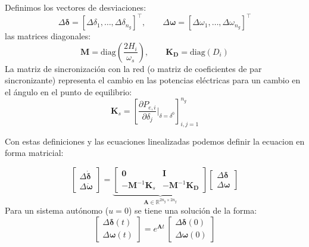Definimos los vectores de desviaciones: 
\begin{equation}
    \Delta\boldsymbol{\delta} = [\Delta\delta_1, \ldots, \Delta\delta_{n_g}]^\top, \qquad
    \Delta\boldsymbol{\omega} = [\Delta\omega_1, \ldots, \Delta\omega_{n_g}]^\top
\end{equation}
 las matrices diagonales:
 \begin{equation}
    \mathbf{M} = \mathrm{diag}\left(\frac{2H_i}{\omega_s}\right), \qquad
    \mathbf{K_D} = \mathrm{diag}(D_i)
 \end{equation}
 La matriz de sincronización con la red (o matriz de coeficientes de par sincronizante) representa el cambio en las potencias eléctricas para un cambio en el ángulo en el punto de equilibrio: 
\begin{equation}
    \mathbf{K}_s = \left[\frac{\partial P_{e,i}}{\partial \delta_j}\big|_{\delta = \delta^0}\right]_{i,j=1}^{n_g}
\end{equation}



Con estas definiciones y las ecuaciones linealizadas podemos definir la ecuacion en forma matricial: 

       \begin{equation}
    \begin{bmatrix} \Delta\dot{\boldsymbol{\delta}} \\ \Delta\dot{\boldsymbol{\omega}} \end{bmatrix}
    =
    \underbrace{
    \begin{bmatrix}
        \mathbf{0}  & \mathbf{I} \\
        -\mathbf{M}^{-1}\mathbf{K}_s & -\mathbf{M}^{-1}\mathbf{K_D}
    \end{bmatrix}
    }_{\mathbf{A} \in \mathbb{R}^{2n_g \times 2n_g}}
    \begin{bmatrix} \Delta\boldsymbol{\delta} \\ \Delta\boldsymbol{\omega} \end{bmatrix}
    \label{eq:linear_sys}
\end{equation}
Para un sistema autónomo ($u=0$) se tiene una solución de la forma: 
\begin{equation}
    \begin{bmatrix} \Delta\boldsymbol{\delta}(t) \\ \Delta\boldsymbol{\omega}(t) \end{bmatrix}
    = e^{\mathbf{A}t}\,
    \begin{bmatrix} \Delta\boldsymbol{\delta}(0) \\ \Delta\boldsymbol{\omega}(0) \end{bmatrix}
    \label{eq:solution}
\end{equation}

